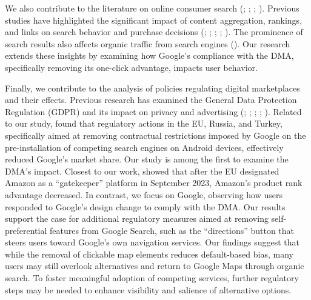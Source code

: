 \documentclass[11pt]{article}
\begin{document}
	We also contribute to the literature on online consumer search (\citealp{bronnenberg2016zooming}; \citealp{amano2022flexible}; \citealp{ursu2023search}; \citealp{honka2024consumer}). Previous studies have highlighted the significant impact of content aggregation, rankings, and links on search behavior and purchase decisions (\citealp{chiou2017content}; \citealp{ursu2018power}; \citealp{roos2020effect}; \citealp{harris2022being}; \citealp{zhang2023product}). The prominence of search results also affects organic traffic from search engines (\citealp{baye2016s}). Our research extends these insights by examining how Google's compliance with the DMA, specifically removing its one-click advantage, impacts user behavior.
	
	Finally, we contribute to the analysis of policies regulating digital marketplaces and their effects. Previous research has examined the General Data Protection Regulation (GDPR) and its impact on privacy and advertising (\citealp{goldfarb2018regulation}; \citealp{johnson2022economic}; \citealp{johnson2023privacy}; \citealp{goldberg2024regulating}; \citealp{miller2024economic}). Related to our study, \cite{decarolis2023competition} found that regulatory actions in the EU, Russia, and Turkey, specifically aimed at removing contractual restrictions imposed by Google on the pre-installation of competing search engines on Android devices, effectively reduced Google's market share. Our study is among the first to examine the DMA's impact. Closest to our work, \cite{waldfogel2024amazon} showed that after the EU designated Amazon as a ``gatekeeper'' platform in September 2023, Amazon's product rank advantage decreased. In contrast, we focus on Google, observing how users responded to Google's design change to comply with the DMA. Our results support the case for additional regulatory measures aimed at removing self-preferential features from Google Search, such as the ``directions'' button that steers users toward Google's own navigation services. Our findings suggest that while the removal of clickable map elements reduces default-based bias, many users may still overlook alternatives and return to Google Maps through organic search. To foster meaningful adoption of competing services, further regulatory steps may be needed to enhance visibility and salience of alternative options.
	
\end{document}
